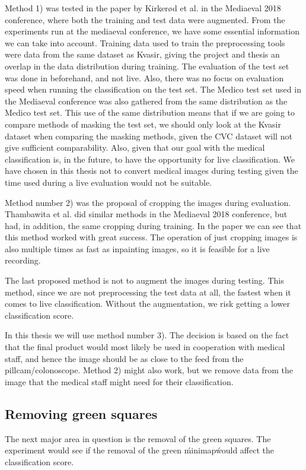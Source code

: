 Method 1)  was tested in the paper by Kirkerød et al. in the Mediaeval 2018 conference, where both the training and test data were augmented.
From the experiments run at the mediaeval conference, we have some essential information we can take into account.  
Training data used to train the preprocessing tools were data from the same dataset as Kvasir, giving the project and thesis an overlap in the data distribution during training. 
The evaluation of the test set was done in beforehand, and not live. Also, there was no focus on evaluation speed when running the classification on the test set. The Medico test set used in the Mediaeval conference was also gathered from the same distribution as the Medico test set. This use of the same distribution means that if we are going to compare methods of masking the test set, we should only look at the Kvasir dataset when comparing the masking methods, given the CVC dataset will not give sufficient comparability.
Also, given that our goal with the medical classification is, in the future, to have the opportunity for live classification. We have chosen in this thesis not to convert medical images during testing given the time used during a live evaluation would not be suitable. 


Method number 2) was the proposal of cropping the images during evaluation.  Thambawita et al. did similar methods in the Mediaeval 2018 conference, but had, in addition, the same cropping during training. In the paper  we can see that this method worked with great success. The operation of just cropping images is also multiple times as fast as inpainting images, so it is feasible for a live recording.  

The last proposed method is not to augment the images during testing. This method, since we are not preprocessing the test data at all, the fastest when it comes to live classification. Without the augmentation, we risk getting a lower classification score.


In this thesis we will use method number 3). The decision is based on the fact that the final product would most likely be used in cooperation with medical staff, and hence the image should be as close to the feed from the pillcam/colonoscope. Method 2) might also work, but we remove data from the image that the medical staff might need for their classification. 

 
\subsection{Removing green squares}
The next major area in question is the removal of the green squares.  The experiment would see if the removal of the green \'minimap\' would affect the classification score. 

